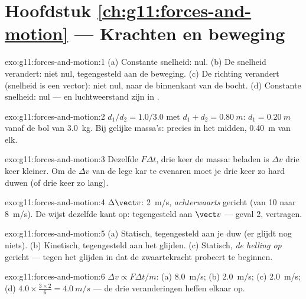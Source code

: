 \section*{Hoofdstuk \ref{ch:g11:forces-and-motion} --- Krachten en beweging}

\begin{solution}{exo:g11:forces-and-motion:1}
(a) Constante snelheid:  nul. (b) De snelheid
verandert: niet nul, tegengesteld aan de beweging. (c) De richting
verandert (snelheid is een vector): niet nul, naar de binnenkant van de
bocht. (d) Constante snelheid: nul ---  en luchtweerstand zijn in
.
\end{solution}

\begin{solution}{exo:g11:forces-and-motion:2}
$d_1/d_2 = 1.0/3.0$ met $d_1 + d_2 = \qty{0.80}{m}$:
$d_1 = \qty{0.20}{m}$ vanaf de bol van \qty{3.0}{kg}. Bij gelijke
massa's: precies in het midden, \qty{0.40}{m} van elk.
\end{solution}

\begin{solution}{exo:g11:forces-and-motion:3}
Dezelfde $F\Delta t$, drie keer de massa: beladen is $\Delta v$ drie keer
kleiner. Om de $\Delta v$ van de lege kar te evenaren moet je drie keer
zo hard duwen (of drie keer zo lang).
\end{solution}

\begin{solution}{exo:g11:forces-and-motion:4}
$\Delta \vect v$: \qty{2}{m/s}, \emph{achterwaarts} gericht (van
\num{10} naar \qty{8}{m/s}). De  wijst dezelfde kant
op: tegengesteld aan $\vect v$ --- geval 2, vertragen.
\end{solution}

\begin{solution}{exo:g11:forces-and-motion:5}
(a) Statisch, tegengesteld aan je duw (er glijdt nog niets).
(b) Kinetisch, tegengesteld aan het glijden. (c) Statisch, \emph{de
helling op} gericht --- tegen het glijden in dat de zwaartekracht
probeert te beginnen.
\end{solution}

\begin{solution}{exo:g11:forces-and-motion:6}
$\Delta v \propto F\Delta t/m$: (a) \qty{8.0}{m/s}; (b) \qty{2.0}{m/s};
(c) \qty{2.0}{m/s}; (d) $4.0 \times \frac{3 \times 2}{6} =
\qty{4.0}{m/s}$ --- de drie veranderingen heffen elkaar op.
\end{solution}

